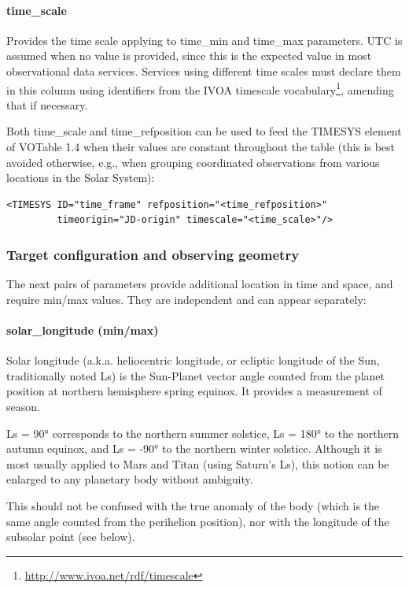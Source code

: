 \documentclass[11pt,a4paper]{ivoa}
\begin{document}
\paragraph{time\_scale}

Provides the time scale applying to time\_min and time\_max parameters.
UTC is assumed when no value is provided, since this
is the expected value in most observational data services.
Services using different time scales must declare them in this column
using identifiers from the IVOA timescale
vocabulary\footnote{\url{http://www.ivoa.net/rdf/timescale}}, amending
that if necessary.

Both time\_scale and time\_refposition can be used to feed the TIMESYS
element of VOTable 1.4 when their values are constant throughout the
table (this is best avoided otherwise, e.g., when grouping coordinated
observations from various locations in the Solar System):

\begin{verbatim}
<TIMESYS ID="time_frame" refposition="<time_refposition>"
         timeorigin="JD-origin" timescale="<time_scale>"/>
\end{verbatim}

\subsubsection{Target configuration and observing geometry}

The next pairs of parameters provide additional location in time and
space, and require min/max values. They are independent and can appear
separately:

\paragraph{solar\_longitude (min/max)}

Solar longitude (a.k.a. heliocentric longitude, or ecliptic longitude of
the Sun, traditionally noted Ls) is the Sun-Planet vector angle counted
from the planet position at northern hemisphere spring equinox. It provides a
measurement of season.

Ls = 90° corresponds to the northern summer solstice, Ls = 180°
to the northern autumn equinox, and Ls = -90° to the northern winter
solstice. Although it is most usually applied to Mars and Titan (using
Saturn's Ls), this notion can be enlarged to any planetary body without
ambiguity.

This should not be confused with the true anomaly of the body (which
is the same angle counted from the perihelion position), nor with the
longitude of the subsolar point (see below).
\end{document}
